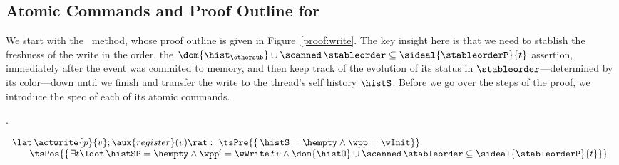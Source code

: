 \subsection{Atomic Commands and Proof Outline for \jywrite}
\label{sc:atoms-write}



We start with the \jywrite\ method, whose proof outline is given in
Figure~\ref{proof:write}. The key insight here is that we need to
stablish the freshness of the write in the order, \ie the $
\dom{\hist_\othersub} \cup \scanned\, \stableorder \subseteq
\sideal{\stableorderP}{t}$ assertion, immediately after the event was
commited to memory, and then keep track of the evolution of its status
in $\stableorder$---determined by its color---down until we finish and
transfer the write to the thread's self history $\histS$. Before we go
over the steps of the proof, we introduce the spec of each of its
atomic commands.

.

\[
\begin{array}{l}
  \lat\,\actwrite{p}{v}; \aux{register}(v)\rat : \
                 {\tsPre{\{\, \histS = \hempty \wedge \wpp = \wInit\}}} \\
  ~~~~ \begin{array}[t]{l}
        \tsPos{\{\, \exists t\ldot\, \histSP = \hempty \wedge
          \wpp' = \wWrite\, t\, v \wedge
          \dom{\histO} \cup \scanned\, \stableorder
          \subseteq \sideal{\stableorderP}{t}\}}
  \end{array}
\end{array}
\]


